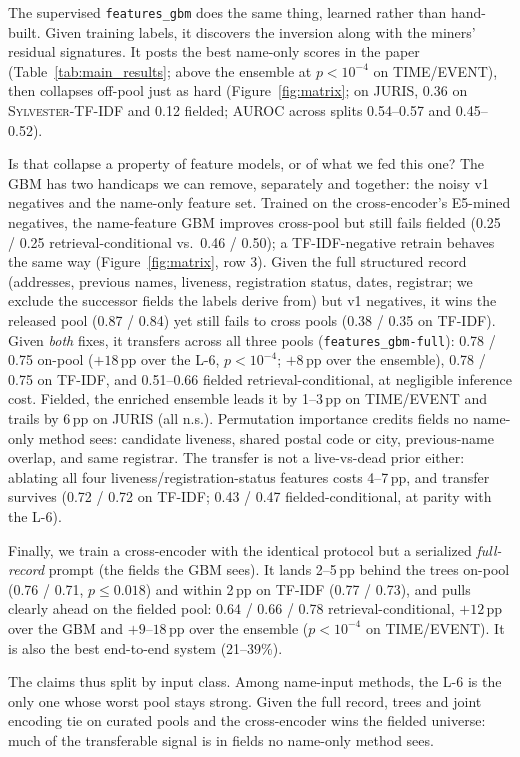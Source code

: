 \documentclass[sigconf]{acmart}
\begin{document}
The supervised \texttt{features\_gbm} does the same thing, learned
rather than hand-built. Given training labels, it discovers the
inversion along with the miners' residual signatures. It posts the
best name-only scores in the paper (Table~\ref{tab:main_results};
above the ensemble at $p<10^{-4}$ on TIME/EVENT), then collapses
off-pool just as hard (Figure~\ref{fig:matrix}; on
JURIS, 0.36 on \textsc{Sylvester-TF-IDF} and 0.12 fielded; AUROC
across splits 0.54--0.57 and 0.45--0.52).

Is that collapse a property of feature models, or of what we fed
this one? The GBM has two handicaps we can remove, separately and
together: the noisy v1 negatives and the name-only feature set.
Trained on the cross-encoder's E5-mined negatives, the name-feature
GBM improves cross-pool but still fails fielded (0.25 / 0.25
retrieval-conditional vs.\ 0.46 / 0.50); a TF-IDF-negative retrain
behaves the same way (Figure~\ref{fig:matrix}, row 3). Given the
full structured record (addresses, previous names, liveness,
registration status, dates, registrar; we exclude the successor
fields the labels derive from) but v1 negatives, it wins the
released pool (0.87 / 0.84) yet still fails to cross pools
(0.38 / 0.35 on TF-IDF). Given \emph{both} fixes, it transfers
across all three pools (\texttt{features\_gbm-full}): 0.78 / 0.75
on-pool ($+18$\,pp over the L-6, $p<10^{-4}$; $+8$\,pp over the
ensemble), 0.78 / 0.75 on TF-IDF, and 0.51--0.66 fielded
retrieval-conditional, at negligible inference cost. Fielded, the
enriched ensemble leads it by 1--3\,pp on TIME/EVENT and trails by
6\,pp on JURIS (all n.s.). Permutation importance credits fields no
name-only method sees: candidate liveness, shared postal code or
city, previous-name overlap, and same registrar. The transfer is
not a live-vs-dead prior either: ablating all four
liveness/registration-status features costs 4--7\,pp, and transfer
survives (0.72 / 0.72 on TF-IDF; 0.43 / 0.47 fielded-conditional,
at parity with the L-6).

Finally, we train a cross-encoder with the identical protocol but a
serialized \emph{full-record} prompt (the fields the GBM sees). It
lands 2--5\,pp behind the trees on-pool (0.76 / 0.71,
$p\leq0.018$) and within 2\,pp on TF-IDF (0.77 / 0.73), and pulls
clearly ahead on the fielded pool: 0.64 / 0.66 / 0.78
retrieval-conditional, $+12$\,pp over the GBM and $+9$--$18$\,pp
over the ensemble ($p<10^{-4}$ on TIME/EVENT). It is also the best
end-to-end system (21--39\%).

The claims thus split by input class. Among name-input methods,
the L-6 is the only one whose worst pool stays strong. Given the
full record, trees and joint encoding tie on curated pools and the
cross-encoder wins the fielded universe: much of the transferable
signal is in fields no name-only method sees.
\end{document}
